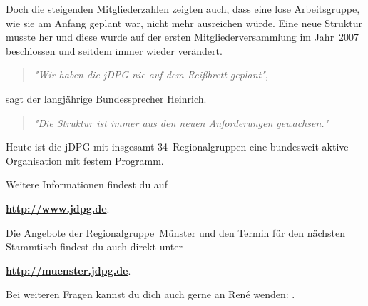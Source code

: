 \begin{multicols}{2}
Doch die steigenden Mitgliederzahlen zeigten auch, dass eine lose Arbeitsgruppe, wie sie am Anfang geplant war, nicht mehr ausreichen würde.
Eine neue Struktur musste her und diese wurde auf der ersten Mitgliederversammlung im Jahr~2007 beschlossen und seitdem immer wieder verändert.
\begin{quote}
    \textit{"Wir haben die jDPG nie auf dem Reißbrett geplant"},
\end{quote}
sagt der langjährige Bundessprecher Heinrich.
\begin{quote}
    \textit{"Die Struktur ist immer aus den neuen Anforderungen gewachsen."}
\end{quote}

Heute ist die jDPG mit insgesamt 34~Regionalgruppen eine bundesweit aktive Organisation mit festem Programm.

Weitere Informationen findest du auf
\begin{center}
    \textbf{\url{http://www.jdpg.de}}.
\end{center}

Die Angebote der Regionalgruppe~Münster und den Termin für den nächsten Stammtisch findest du auch direkt unter
\begin{center}
    \textbf{\url{http://muenster.jdpg.de}}.
\end{center}

Bei weiteren Fragen kannst du dich auch gerne an René wenden:
\textbf{}.


\end{multicols}
